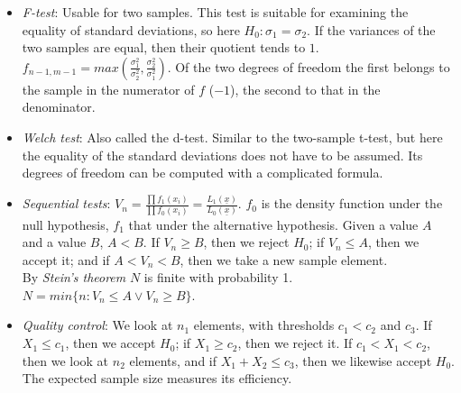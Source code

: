 \documentclass[margin=0px]{article}
\begin{document}
\begin{itemize}
\begin{itemize}
              \item \textit{One-sample}: $H_0: m = m_0$. The alternative hypothesis similarly to the u-test. $t = \sqrt{n}\frac{\overline{\xi} - m_0}{\sqrt{\sigma_{*}^2}}$, where $\sigma_{*}^2$ is the corrected empirical variance, which we can compute from the sample. (Remark: instead of $n$ we divide by $n-1$ in the formula.) This value is $t$-distributed under $H_0$, with $n-1$ degrees of freedom. This test is also called the Student's test.
              \item \textit{Two-sample}: $\xi_i \sim N(m_1, \sigma_1^2)$, $i=1..n$ and $\eta_j \sim N(m_2, \sigma_2^2)$, $j=1..m$. In this case too the standard deviation is not known, but we assume that the standard deviations of the two samples are equal. Then $t_{n+m-2} = \sqrt{\frac{nm(n+m-2)}{n+m}}\frac{\overline{\xi} - \overline{\eta}}{\sqrt{\sum{(\xi_i - \overline{\xi})^2} + \sum{(\eta_j - \overline{\eta})^2}}}$. $n+m-2$ is the degrees of freedom of the test.
          \end{itemize}
    \item \textit{F-test}: Usable for two samples. This test is suitable for examining the equality of standard deviations, so here $H_0 : \sigma_1 = \sigma_2$. If the variances of the two samples are equal, then their quotient tends to $1$. $f_{n-1,m-1} = max(\frac{\sigma_1^2}{\sigma_2^2}, \frac{\sigma_2^2}{\sigma_1^2})$. Of the two degrees of freedom the first belongs to the sample in the numerator of $f$ ($-1$), the second to that in the denominator.
    \item \textit{Welch test}: Also called the d-test. Similar to the two-sample t-test, but here the equality of the standard deviations does not have to be assumed. Its degrees of freedom can be computed with a complicated formula.
    \item \textit{Sequential tests}: $V_n = \frac{\prod{f_1(x_i)}}{\prod{f_0(x_i)}} = \frac{L_1(\underline{x})}{L_0(\underline{x})}$. $f_0$ is the density function under the null hypothesis, $f_1$ that under the alternative hypothesis. Given a value $A$ and a value $B$, $A<B$. If $V_n \geq B$, then we reject $H_0$; if $V_n \leq A$, then we accept it; and if $A < V_n < B$, then we take a new sample element. \\
          By \textit{Stein's theorem} $N$ is finite with probability 1. $N = min\{n: V_n \leq A \vee V_n \geq B \}$.
    \item \textit{Quality control}: We look at $n_1$ elements, with thresholds $c_1 < c_2$ and $c_3$. If $X_1 \leq c_1$, then we accept $H_0$; if $X_1 \geq c_2$, then we reject it. If $c_1 < X_1 < c_2$, then we look at $n_2$ elements, and if $X_1 + X_2 \leq c_3$, then we likewise accept $H_0$. The expected sample size measures its efficiency.

\end{itemize}
\end{document}
